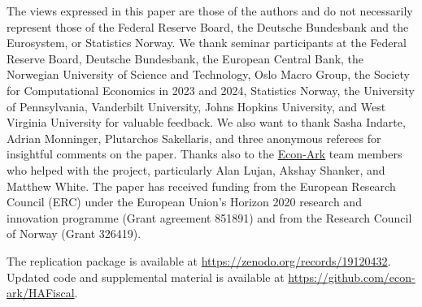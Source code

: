 \documentclass[qe,draft]{econsocart}
\theoremstyle{plain}
\theoremstyle{definition}
\begin{document}
{  %
  \begin{funding}
    The views expressed in this paper are those of the authors and do not necessarily
    represent those of the Federal Reserve Board, the Deutsche Bundesbank and the
    Eurosystem, or Statistics Norway. We thank seminar participants at the Federal
    Reserve Board, Deutsche Bun\-des\-bank, the European Central Bank, the Norwegian
    University of Science and Technology, Oslo Macro Group, the Society for
    Com\-pu\-ta\-tion\-al Economics in 2023 and 2024, Statistics Norway, the
    University of Pennsylvania, Vanderbilt University, Johns Hopkins University, and
    West Virginia University for valuable feedback. We also want to thank Sasha
    Indarte, Adrian Mon\-ninger, Plutarchos Sa\-kel\-la\-ris, and three anonymous
    referees for insightful comments on the paper. Thanks also to the
    \href{https://econ-ark.org}{Econ-Ark} team members who helped with the project,
    particularly Alan Lujan, Akshay Shanker, and Matthew White. The paper has
    received funding from the European Research Council (ERC) under the European
    Union's Horizon 2020 research and innovation programme (Grant agreement 851891)
    and from the Research Council of Norway (Grant 326419).

    The replication package is available at \url{https://zenodo.org/records/19120432}.
    Updated code and supplemental material is available at
    \url{https://github.com/econ-ark/HAFiscal}.
  \end{funding}

  \begin{abstract}
    \AbstractText
  \end{abstract}

  \begin{keyword}
  \end{keyword}

  \begin{keyword}[class=JEL]
  \end{keyword}
}

\end{document}
